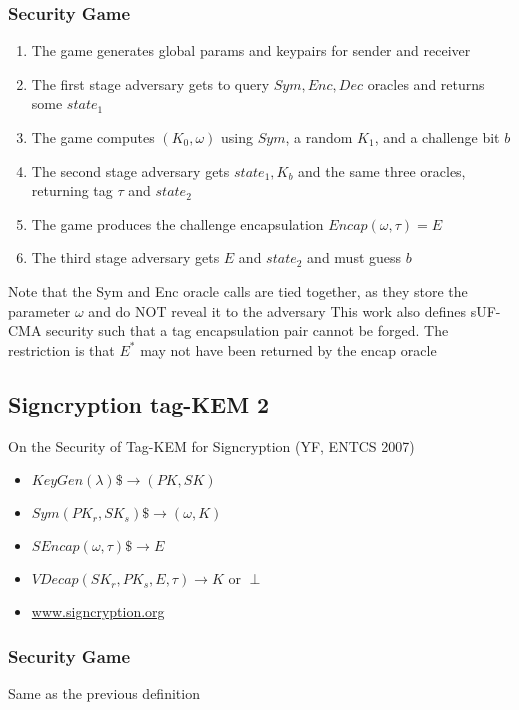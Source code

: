 \documentclass[11pt, pdftex]{article}
\begin{document}
\subsubsection{Security Game}
\begin{enumerate}
\item The game generates global params and keypairs for sender and receiver
\item The first stage adversary gets to query $Sym, Enc, Dec$ oracles and returns some $state_1$
\item The game computes $(K_0,\omega)$ using $Sym$, a random $K_1$, and a challenge bit $b$
\item The second stage adversary gets $state_1,K_b$ and the same three oracles, returning tag $\tau$ and $state_2$
\item The game produces the challenge encapsulation $Encap(\omega, \tau) = E$
\item The third stage adversary gets $E$ and $state_2$ and must guess $b$
\end{enumerate}
Note that the Sym and Enc oracle calls are tied together, as they store the parameter $\omega$ and do NOT reveal it to the adversary
This work also defines sUF-CMA security such that a tag encapsulation pair cannot be forged.  The restriction is that $E^*$ may
not have been returned by the encap oracle


\subsection{Signcryption tag-KEM 2} 
On the Security of Tag-KEM for Signcryption (YF, ENTCS 2007)
\begin{itemize}
\item $KeyGen(\lambda) \$\rightarrow (PK, SK)$
\item $Sym(PK_r, SK_s) \$\rightarrow (\omega, K)$
\item $SEncap(\omega, \tau) \$\rightarrow E$
\item $VDecap(SK_r, PK_s, E, \tau) \rightarrow K \text{ or }\perp$
\item \url{www.signcryption.org}
\end{itemize}

\subsubsection{Security Game}
Same as the previous definition
\end{document}

